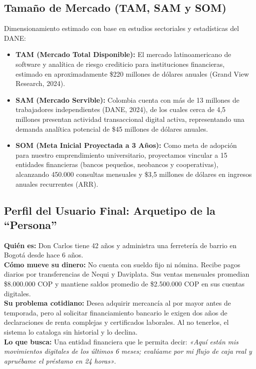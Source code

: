 \documentclass[11pt,a4paper]{article}
\begin{document}
\subsection{Tama\~no de Mercado (TAM, SAM y SOM)}
Dimensionamiento estimado con base en estudios sectoriales y estad\'isticas del DANE:
\begin{itemize}[leftmargin=*]
    \item \textbf{TAM (Mercado Total Disponible):} El mercado latinoamericano de software y anal\'itica de riesgo crediticio para instituciones financieras, estimado en aproximadamente \$220 millones de d\'olares anuales (Grand View Research, 2024).
    \item \textbf{SAM (Mercado Servible):} Colombia cuenta con m\'as de 13 millones de trabajadores independientes (DANE, 2024), de los cuales cerca de 4,5 millones presentan actividad transaccional digital activa, representando una demanda anal\'itica potencial de \$45 millones de d\'olares anuales.
    \item \textbf{SOM (Meta Inicial Proyectada a 3 A\~nos):} Como meta de adopci\'on para nuestro emprendimiento universitario, proyectamos vincular a 15 entidades financieras (bancos peque\~nos, neobancos y cooperativas), alcanzando 450.000 consultas mensuales y \$3,5 millones de d\'olares en ingresos anuales recurrentes (ARR).
\end{itemize}

\subsection{Perfil del Usuario Final: Arquetipo de la ``Persona''}

\begin{tcolorbox}[colback=lightgray,colframe=primary,title={\textbf{Arquetipo: Don Carlos, Comerciante Independiente Urbano}}]
\textbf{Qui\'en es:} Don Carlos tiene 42 a\~nos y administra una ferreter\'ia de barrio en Bogot\'a desde hace 6 a\~nos.\\
\textbf{C\'omo mueve su dinero:} No cuenta con sueldo fijo ni n\'omina. Recibe pagos diarios por transferencias de Nequi y Daviplata. Sus ventas mensuales promedian \$8.000.000 COP y mantiene saldos promedio de \$2.500.000 COP en sus cuentas digitales.\\
\textbf{Su problema cotidiano:} Desea adquirir mercanc\'ia al por mayor antes de temporada, pero al solicitar financiamiento bancario le exigen dos a\~nos de declaraciones de renta complejas y certificados laborales. Al no tenerlos, el sistema lo cataloga sin historial y lo declina.\\
\textbf{Lo que busca:} Una entidad financiera que le permita decir: \textit{«Aqu\'i est\'an mis movimientos digitales de los \'ultimos 6 meses; eval\'uame por mi flujo de caja real y apru\'ebame el pr\'estamo en 24 horas»}.
\end{tcolorbox}
\end{document}
